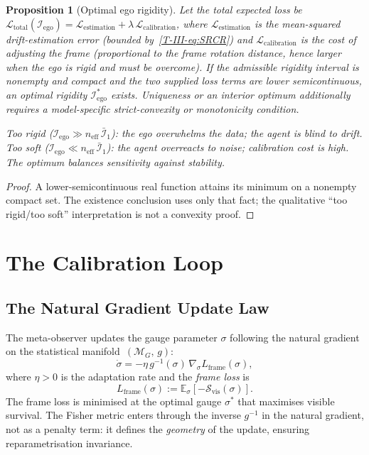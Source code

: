 \documentclass[12pt,a4paper,openany]{book}
\newtheorem{proposition}[theorem]{Proposition}
\begin{document}
\begin{proposition}[Optimal ego rigidity]
\label{T-III-prop:optimal_rigidity}
Let the total expected loss be
$\mathcal{L}_{\mathrm{total}}
(\mathcal{I}_{\mathrm{ego}})
= \mathcal{L}_{\mathrm{estimation}}
+ \lambda\,\mathcal{L}_{\mathrm{calibration}}$,
where $\mathcal{L}_{\mathrm{estimation}}$ is the
mean-squared drift-estimation error
(bounded by~\eqref{T-III-eq:SRCR}) and
$\mathcal{L}_{\mathrm{calibration}}$ is the cost of
adjusting the frame (proportional to the frame rotation
distance, hence larger when the ego is rigid and must be
overcome).
If the admissible rigidity interval is nonempty and compact and the two
supplied loss terms are lower semicontinuous, an optimal rigidity
$\mathcal{I}_{\mathrm{ego}}^*$ exists.  Uniqueness or an interior
optimum additionally requires a model-specific strict-convexity or
monotonicity condition.

\emph{Too rigid}
($\mathcal{I}_{\mathrm{ego}} \gg n_{\mathrm{eff}}\,\bar{\mathcal I}_1$):
the ego overwhelms the data; the agent is blind to drift.
\emph{Too soft}
($\mathcal{I}_{\mathrm{ego}} \ll n_{\mathrm{eff}}\,\bar{\mathcal I}_1$):
the agent overreacts to noise; calibration cost is high.
The optimum balances sensitivity against stability.
\end{proposition}

\begin{proof}
A lower-semicontinuous real function attains its minimum on a nonempty
compact set.  The existence conclusion uses only that fact; the
qualitative ``too rigid/too soft'' interpretation is not a convexity
proof.
\end{proof}

\section{The Calibration Loop}
\label{T-III-sec:loop}

\subsection{The Natural Gradient Update Law}
\label{T-III-subsec:update_law}

The meta-observer updates the gauge parameter $\sigma$
following the natural gradient on the statistical
manifold~$(\mathcal{M}_G,\,g)$:
\begin{equation}
\label{T-III-eq:update_law}
\dot{\sigma}
= -\eta\,g^{-1}(\sigma)\,
  \nabla_\sigma L_{\mathrm{frame}}(\sigma),
\end{equation}
where $\eta > 0$ is the adaptation rate and the
\emph{frame loss} is
\begin{equation}
\label{T-III-eq:frame_loss}
L_{\mathrm{frame}}(\sigma)
:= \mathbb{E}_\sigma\!\left[
  -\mathcal{S}_{\mathrm{vis}}(\sigma)\right].
\end{equation}
The frame loss is minimised at the optimal gauge
$\sigma^*$ that maximises visible survival.
The Fisher metric enters through the inverse $g^{-1}$
in the natural gradient, not as a penalty term:
it defines the \emph{geometry} of the update, ensuring
reparametrisation invariance.
\end{document}
